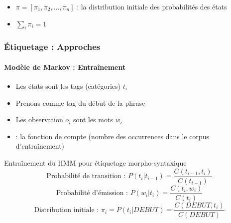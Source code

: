 \documentclass[xcolor=table]{beamer}
\begin{document}
\begin{frame}[fragile]
\begin{minipage}{.45\textwidth}
\end{minipage}

\begin{itemize}
	\item $\pi = [\pi_1, \pi_2, \ldots, \pi_n ]$ : la distribution initiale des probabilités des états
	\item $\sum_i \pi_i = 1$
\end{itemize}

\end{frame}

\begin{frame}
\frametitle{Étiquetage : Approches}
\framesubtitle{Modèle de Markov : Entraînement}

\begin{itemize}
	\item Les états sont les tags (catégories) $t_i$
	\item Prenons  comme tag du début de la phrase
	\item Les observation $o_i$ sont les mots $w_i$
	\item {} : la fonction de compte (nombre des occurrences dans le corpus d'entraînement)
\end{itemize}

\begin{block}{Entraînement du HMM pour étiquetage morpho-syntaxique}
	\[
	\text{Probabilité de transition : } P(t_i | t_{i-1}) = \frac{C(t_{i-1}, t_i)}{C(t_{i-1})} 
	\]\[
	\text{Probabilité d'émission : } P(w_i | t_i) = \frac{C(t_i, w_i)}{C(t_i)}
	\]\[
	\text{Distribution initiale : } \pi_i = P(t_i | DEBUT) = \frac{C(DEBUT, t_i)}{C(DEBUT)}
	\]
	
\end{block}

\end{frame}
\end{document}
